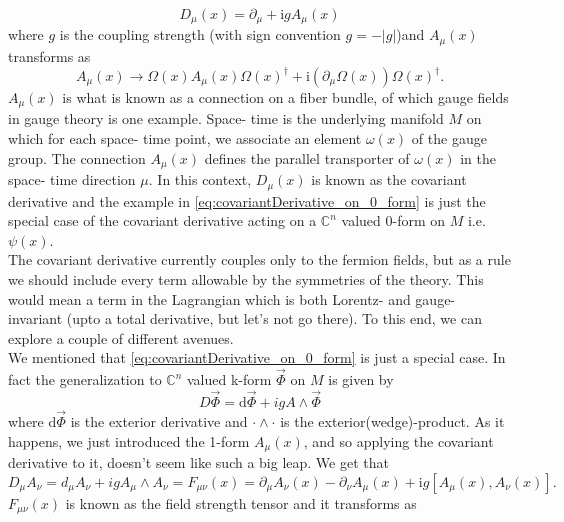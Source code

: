 \documentclass[a4paper,10pt]{article}
\begin{document}
\begin{equation}\label{eq:covariantDerivative_on_0_form}
D_{\mu}(x) = \partial_{\mu}+\mathrm{i}g A_{\mu}(x)
\end{equation}
where $g$ is the coupling strength (with sign convention $g=-|g|$)and $A_{\mu}(x)$ transforms as 
\begin{equation}
A_{\mu}(x) \rightarrow \Omega(x) A_{\mu}(x) \Omega(x)^{\dagger}+\mathrm{i}\left(\partial_{\mu} \Omega(x)\right) \Omega(x)^{\dagger}.
\end{equation}
$A_{\mu}(x)$ is what is known as a connection on a fiber bundle, of which gauge fields in gauge theory is one example. Space- time is the underlying manifold $M$ on which for each space- time point, we associate an element $\omega(x)$ of the gauge group. The connection $A_{\mu}(x)$ defines the parallel transporter of $\omega(x)$ in the space- time direction $\mu$. In this context, $D_{\mu}(x)$ is known as the covariant derivative and the example in \eqref{eq:covariantDerivative_on_0_form} is just the special case of the covariant derivative acting on a $\mathbb{C}^n$ valued 0-form on $M$ i.e. $\psi(x)$.\\The covariant derivative currently couples only to the fermion fields, but as a rule we should include every term allowable by the symmetries of the theory. This would mean a term in the Lagrangian which is both Lorentz- and gauge- invariant (upto a total derivative, but let's not go there). To this end, we can explore a couple of different avenues.\\We mentioned that \eqref{eq:covariantDerivative_on_0_form} is just a special case. In fact the generalization to $\mathbb{C}^n$ valued k-form $\vec{\Phi}$ on $M$ is given by
\begin{equation}
D \vec{\Phi}=\mathrm{d} \vec{\Phi}+i g A \wedge \vec{\Phi}
\end{equation}
where $\mathrm{d} \vec{\Phi}$ is the exterior derivative and $\cdot \wedge\cdot$ is the exterior(wedge)-product.
As it happens, we just introduced the 1-form $A_{\mu}(x)$, and so applying the covariant derivative to it, doesn't seem like such a big leap. We get that
\begin{equation}\label{eq:covariantDerivative_on_1_form}
D_\mu A_{\nu}= d_\mu A_{\nu} + igA_{\mu} \wedge A_{\nu} =F_{\mu \nu}(x)=\partial_{\mu} A_{\nu}(x)-\partial_{\nu} A_{\mu}(x)+\mathrm{i}g\left[A_{\mu}(x), A_{\nu}(x)\right].
\end{equation}
$F_{\mu \nu}(x)$ is known as the field strength tensor and it transforms as
\end{document}
